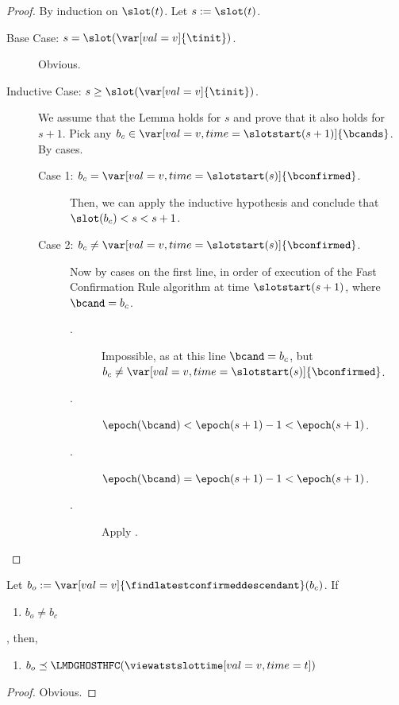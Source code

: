 \documentclass{article}
\begin{document}
\begin{proof}
    By induction on $\slot(t)$.
    Let $s := \slot(t)$.
    \begin{description}
        \item[Base Case: {$s = \slot(\var[val=v]{\tinit})$}.] Obvious.
        \item[Inductive Case: {$s \geq \slot(\var[val=v]{\tinit})$}.]
            We assume that the Lemma holds for $s$ and prove that it also holds for $s+1$.
            Pick any $b_c \in \var[val=v,time=\slotstart(s+1)]{\bcands}$.
            By cases.
            \begin{description}
                \item[Case 1: {$b_c = \var[val=v,time=\slotstart(s)]{\bconfirmed}$}.] Then, we can apply the inductive hypothesis and conclude that $\slot(b_c) < s < s+1$.
                \item[Case 2: {$b_c \neq \var[val=v,time=\slotstart(s)]{\bconfirmed}$}.]
                Now by cases on the first line, in order of execution of the Fast Confirmation Rule algorithm at time $\slotstart(s+1)$, where $\bcand = b_c$. 
                \begin{description}
                    \item[.] 
                    Impossible, as at this line $\bcand = b_c$, but $b_c \neq \var[val=v,time=\slotstart(s)]{\bconfirmed}$.
                    \item[.] $\epoch(\bcand) < \epoch(s+1)-1 < \epoch(s+1)$.
                    \item[.] $\epoch(\bcand) = \epoch(s+1)-1 < \epoch(s+1)$. 
                    \item[.] Apply .
                \end{description}
            \end{description}
    \end{description}
\end{proof}

\begin{lemma}\label{lem:out-find-latest-conf-prec-head}
    Let $b_o := \var[val=v]{\findlatestconfirmeddescendant}(b_c)$.
    If 
    \begin{enumerate}
        \item $b_o \neq b_c$
    \end{enumerate},
    then, 
    \begin{enumerate}
        \item $b_o \preceq \LMDGHOSTHFC(\viewatstslottime[val=v,time=t])$
    \end{enumerate}
\end{lemma}
\begin{proof}
    Obvious.
\end{proof}
\end{document}
